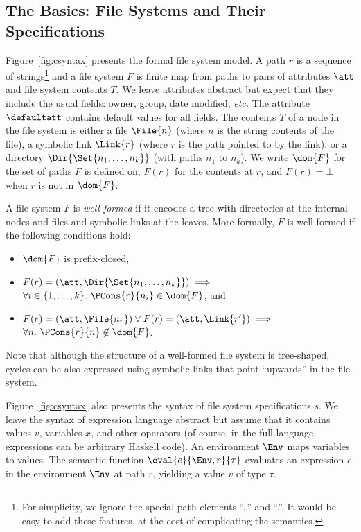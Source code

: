 \subsection{The Basics: File Systems and Their Specifications}

%
Figure~\ref{fig:csyntax} presents the formal file system
model. A path $r$ is a sequence of strings\footnote{For simplicity, we
  ignore the special path elements ``..'' and ``.''.  It would be easy
  to add these features, at the cost of complicating the semantics.}
and a file system $F$ is finite map from paths to pairs of attributes
$\att$ and file system contents $T$.  We leave attributes abstract but
expect that they include the usual fields: owner, group, date
modified, {\it etc.}  The attribute $\defaultatt$ contains default
values for all fields. The contents $T$ of a node in the file system
is either a file $\File{n}$ (where $n$ is the string contents of the
file), a symbolic link $\Link{r}$ (where $r$ is the path pointed to by
the link), or a directory $\Dir{\Set{n_1,\dots,n_k}}$ (with paths
$n_1$ to $n_k$). We write $\dom{F}$ for the set of paths $F$ is defined on, 
$F(r)$ for the contents at $r$, and $F(r) = \bot$ when $r$ is not
in $\dom{F}$.

A file system $F$ is {\em well-formed} if it encodes a tree with
directories at the internal nodes and files and symbolic links at the
leaves. More formally, $F$ is well-formed if the following conditions
hold:
%
\begin{itemize}
\item $\dom{F}$ is prefix-closed,
\item $F(r) = (\att,\Dir{ \Set{n_1,\dots,n_k} }) \implies$\\ \hspace*{3.3mm}$\forall i \in \{1,\dots,k\}.~\PCons{r}{n_i} \in \dom{F}$, and
\item $F(r) = (\att,\File{n_r}) \vee F(r) = (\att,\Link{r'}) \implies$\\ \hspace*{3.3mm}$\forall n.~\PCons{r}{n} \not\in \dom{F}$.
\end{itemize}
%
Note that although the structure of a well-formed file system is
tree-shaped, cycles can be also expressed using symbolic links that
point ``upwards'' in the file system.

%
Figure~\ref{fig:csyntax} also presents the syntax of file
system specifications $s$.  We leave the syntax of expression language
abstract but assume that it contains values $v$, variables $x$, and
other operators (of course, in the full \forest{} language,
expressions can be arbitrary Haskell code).  An environment $\Env$
maps variables to values.  The semantic function
$\eval{e}{\Env,r}{\tau}$ evaluates an expression $e$ in the
environment $\Env$ at path $r$, yielding a value $v$ of type $\tau$.

